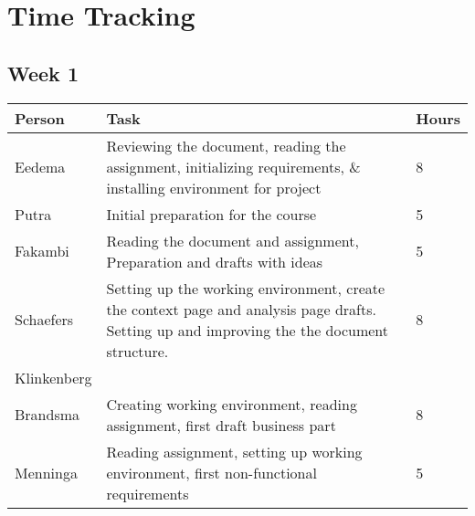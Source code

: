 \chapter{Time Tracking}
\label{App: Time Tracking}


\section{Week 1}
\begin{tabular}{L{0.2\textwidth} L{0.7\textwidth} L{0.1\textwidth}}
	\textbf{Person} & \textbf{Task}                                                                                                                              & \textbf{Hours} \\ \toprule
	Eedema          & Reviewing the document, reading the assignment, initializing requirements, \& installing environment for project                           & 8              \\ \midrule
	Putra           & Initial preparation for the course                                                                                                         & 5              \\ \midrule
	Fakambi         & Reading the document and assignment, Preparation and drafts with ideas                                                                     & 5              \\ \midrule
	Schaefers       & Setting up the working environment, create the context page and analysis page drafts. Setting up and improving the the document structure. & 8              \\ \midrule
	Klinkenberg     &                                                                                                                                            &                \\ \midrule
	Brandsma        & Creating working environment, reading assignment, first draft business part                                                                & 8              \\ \midrule
	Menninga        & Reading assignment, setting up working environment, first non-functional requirements                                                      & 5              \\ \bottomrule
\end{tabular}

